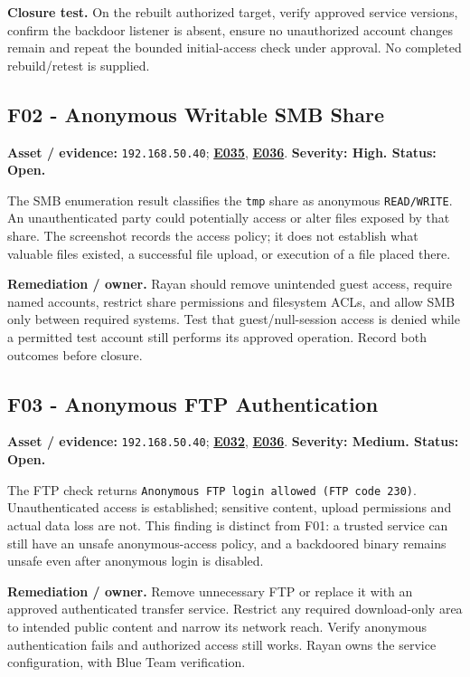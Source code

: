 \documentclass[11pt,a4paper]{article}
\newcommand{\ev}[1]{\hyperref[ev:#1]{\textbf{#1}}}
\begin{document}
\textbf{Closure test.} On the rebuilt authorized target, verify approved service versions, confirm the backdoor listener is absent, ensure no unauthorized account changes remain and repeat the bounded initial-access check under approval. No completed rebuild/retest is supplied.

\subsection{F02 - Anonymous Writable SMB Share}
\textbf{Asset / evidence:} \texttt{192.168.50.40}; \ev{E035}, \ev{E036}. \textbf{Severity: High. Status: Open.}

The SMB enumeration result classifies the \texttt{tmp} share as anonymous \texttt{READ/WRITE}. An unauthenticated party could potentially access or alter files exposed by that share. The screenshot records the access policy; it does not establish what valuable files existed, a successful file upload, or execution of a file placed there.

\textbf{Remediation / owner.} Rayan should remove unintended guest access, require named accounts, restrict share permissions and filesystem ACLs, and allow SMB only between required systems. Test that guest/null-session access is denied while a permitted test account still performs its approved operation. Record both outcomes before closure.

\subsection{F03 - Anonymous FTP Authentication}
\textbf{Asset / evidence:} \texttt{192.168.50.40}; \ev{E032}, \ev{E036}. \textbf{Severity: Medium. Status: Open.}

The FTP check returns \texttt{Anonymous FTP login allowed (FTP code 230)}. Unauthenticated access is established; sensitive content, upload permissions and actual data loss are not. This finding is distinct from F01: a trusted service can still have an unsafe anonymous-access policy, and a backdoored binary remains unsafe even after anonymous login is disabled.

\textbf{Remediation / owner.} Remove unnecessary FTP or replace it with an approved authenticated transfer service. Restrict any required download-only area to intended public content and narrow its network reach. Verify anonymous authentication fails and authorized access still works. Rayan owns the service configuration, with Blue Team verification.
\end{document}
